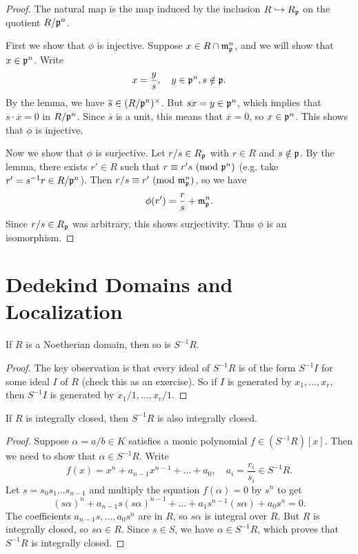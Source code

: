 \begin{proof}
  The natural map is the map induced by the
  inclusion $R \hookrightarrow R_{\mathfrak{p}}$ on the quotient
  $R / \mathfrak{p}^n$.

  First we show that $\phi$ is injective.
  Suppose $x \in R \cap \mathfrak{m}_{\mathfrak{p}}^n$, and we will show
  that $x \in \mathfrak{p}^n$. Write
  \[
    x = \frac{y}{s}, \quad y \in \mathfrak{p}^n, s \notin \mathfrak{p}.
  \]
  By the lemma, we have
  $\overline{s} \in (R / \mathfrak{p}^n)^\times$. But
  $sx = y \in \mathfrak{p}^n$, which implies that $\overline{s} \cdot \overline{x} = 0$
  in $R / \mathfrak{p}^n$. Since $\overline{s}$ is a unit,
  this means that $\overline{x} = 0$, so $x \in \mathfrak{p}^n$.
  This shows that $\phi$ is injective.

  Now we show that $\phi$ is surjective.
  Let $r / s \in R_{\mathfrak{p}}$ with $r \in R$ and
  $s \notin \mathfrak{p}$. By the lemma, there exists $r' \in R$
  such that $r \equiv r' s \ (\mathrm{mod}\ \mathfrak{p}^n)$ (e.g.
  take $r' = s^{-1} r \in R / \mathfrak{p}^n$). Then
  $r / s \equiv r' \ (\mathrm{mod}\ \mathfrak{m}_{\mathfrak{p}}^n)$, so we have
  \[
    \phi(r') = \frac{r}{s} + \mathfrak{m}_{\mathfrak{p}}^n.
  \]
  Since $r / s \in R_{\mathfrak{p}}$ was arbitrary, this shows
  surjectivity. Thus $\phi$ is an isomorphism.
\end{proof}

\section{Dedekind Domains and Localization}

\begin{lemma}
  If $R$ is a Noetherian domain, then so is
  $S^{-1} R$.
\end{lemma}

\begin{proof}
  The key observation is that every ideal of
  $S^{-1} R$ is of the form $S^{-1} I$ for some ideal
  $I$ of $R$ (check this as an exercise).
  So if $I$ is generated by $x_1, \dots, x_r$,
  then $S^{-1} I$ is generated by $x_1 / 1, \dots, x_r / 1$.
\end{proof}

\begin{lemma}
  If $R$ is integrally closed, then $S^{-1} R$ is also
  integrally closed.
\end{lemma}

\begin{proof}
  Suppose $\alpha = a / b \in K$ satisfies
  a monic polynomial $f \in (S^{-1} R)[x]$. Then we need
  to show that $\alpha \in S^{-1} R$. Write
  \[
    f(x) = x^n + a_{n - 1} x^{n - 1} + \dots + a_0,
    \quad a_i = \frac{r_i}{s_i} \in S^{-1} R.
  \]
  Let $s = s_0 s_1 \dots s_{n - 1}$ and multiply the
  equation $f(\alpha) = 0$ by $s^n$ to get
  \[
    (s\alpha)^n + a_{n - 1} s (s \alpha)^{n - 1}
    + \dots + a_1 s^{n - 1} (s\alpha) + a_0 s^n = 0.
  \]
  The coefficients $a_{n - 1} s, \dots, a_0 s^n$
  are in $R$, so $s \alpha$ is integral over $R$.
  But $R$ is integrally closed, so $s \alpha \in R$.
  Since $s \in S$, we have $\alpha \in S^{-1} R$, which
  proves that $S^{-1} R$ is integrally closed.
\end{proof}

